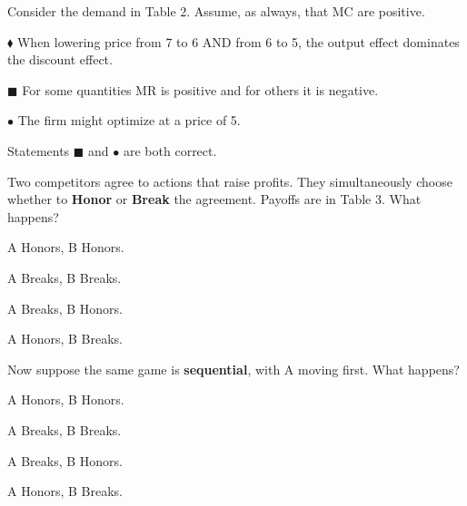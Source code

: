 \documentclass[12pt]{article}
\newcommand{\question}[1]{%
  \Needspace{9\baselineskip}%
  \item #1%
  \vspace{-0.45em}  %
}
\begin{document}
\begin{questions}
  \question{Consider the demand in Table 2. Assume, as always, that MC are positive.}
  \begin{choices}
    \item \(\blacklozenge\) When lowering price from 7 to 6 AND from 6 to 5, the output effect dominates the discount effect.
    \item \(\blacksquare\) For some quantities MR is positive and for others it is negative.
    \item \(\bullet\) The firm might optimize at a price of 5.
    \item Statements \(\blacksquare\) and \(\bullet\) are both correct.
  \end{choices}


  \question{Two competitors agree to actions that raise profits. They simultaneously choose whether to \textbf{Honor} or \textbf{Break} the agreement. Payoffs are in Table 3. What happens?}
  \begin{choices}
    \item A Honors, B Honors.
    \item A Breaks, B Breaks.
    \item A Breaks, B Honors.
    \item A Honors, B Breaks.
  \end{choices}


  \question{Now suppose the same game is \textbf{sequential}, with A moving first. What happens?}
  \begin{choices}
    \item A Honors, B Honors.
    \item A Breaks, B Breaks.
    \item A Breaks, B Honors.
    \item A Honors, B Breaks.
  \end{choices}

\end{questions}

\end{document}
